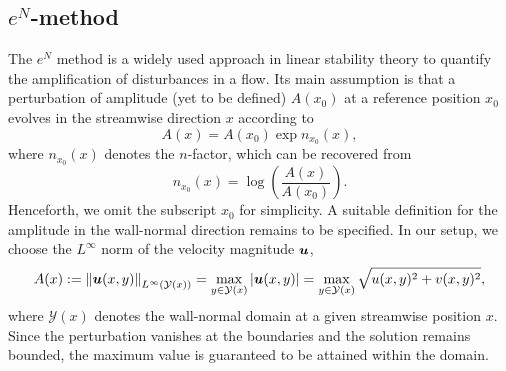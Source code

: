 \documentclass[../main.tex]{subfiles}
\begin{document}

\subsection{\texorpdfstring{$e^N$}{eN}-method}

The $e^N$ method is a widely used approach in linear stability theory to quantify the amplification of disturbances in a flow. Its main assumption is that a perturbation of amplitude (yet to be defined) $A(x_0)$ at a reference position $x_0$ evolves in the streamwise direction $x$ according to
\begin{equation}
	A(x) = A(x_0) \exp{n_{x_0}(x)},
	\label{eq:amplitudeEvolution}
\end{equation}
where $n_{x_0}(x)$ denotes the $n$-factor, which can be recovered from
\begin{equation}
	n_{x_0}(x) = \log\left( \frac{A(x)}{A(x_0)} \right).
	\label{eq:nfactorAmplitude}
\end{equation}
Henceforth, we omit the subscript $x_0$ for simplicity. A suitable definition for the amplitude in the wall-normal direction remains to be specified. In our setup, we choose the $L^\infty$ norm of the velocity magnitude $\bm{u}$,
\begin{equation}
	A(x) := \left\|\bm{u}(x,y)\right\|_{L^\infty(\mathcal{Y}(x))} = \max_{y \in \mathcal{Y}(x)} |\bm{u}(x,y)| = \max_{y \in \mathcal{Y}(x)} \sqrt{u(x,y)^2 + v(x,y)^2},
	\label{eq:amplitudeNorm}
\end{equation}
where $\mathcal{Y}(x)$ denotes the wall-normal domain at a given streamwise position $x$. Since the perturbation vanishes at the boundaries and the solution remains bounded, the maximum value is guaranteed to be attained within the domain.


\end{document}
